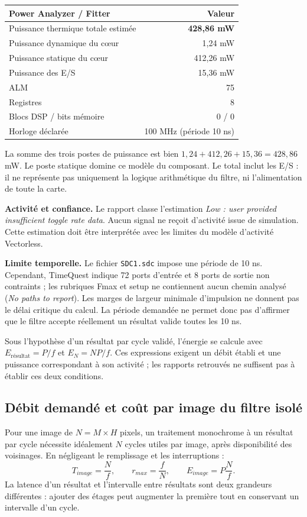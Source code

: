 \documentclass[11pt,a4paper]{article}
\begin{document}
\begin{center}
\begin{tabular}{@{}lr@{}}
\toprule
Power Analyzer / Fitter & Valeur\\
\midrule
Puissance thermique totale estimée & \textbf{428,86 mW}\\
Puissance dynamique du c\oe{}ur & 1,24 mW\\
Puissance statique du c\oe{}ur & 412,26 mW\\
Puissance des E/S & 15,36 mW\\
ALM & 75\\
Registres & 8\\
Blocs DSP / bits mémoire & 0 / 0\\
Horloge déclarée & 100 MHz (période 10 ns)\\
\bottomrule
\end{tabular}
\end{center}
La somme des trois postes de puissance est bien $1{,}24+412{,}26+15{,}36=428{,}86$ mW. Le poste statique domine ce modèle du composant. Le total inclut les E/S : il ne représente pas uniquement la logique arithmétique du filtre, ni l'alimentation de toute la carte.

\textbf{Activité et confiance.} Le rapport classe l'estimation \emph{Low : user provided insufficient toggle rate data}. Aucun signal ne reçoit d'activité issue de simulation. Cette estimation doit être interprétée avec les limites du modèle d'activité Vectorless.

\textbf{Limite temporelle.} Le fichier \texttt{SDC1.sdc} impose une période de 10 ns. Cependant, TimeQuest indique 72 ports d'entrée et 8 ports de sortie non contraints ; les rubriques Fmax et setup ne contiennent aucun chemin analysé (\emph{No paths to report}). Les marges de largeur minimale d'impulsion ne donnent pas le délai critique du calcul. La période demandée ne permet donc pas d'affirmer que le filtre accepte réellement un résultat valide toutes les 10 ns.

Sous l'hypothèse d'un résultat par cycle validé, l'énergie se calcule avec $E_{\mathrm{résultat}}=P/f$ et $E_N=NP/f$. Ces expressions exigent un débit établi et une puissance correspondant à son activité ; les rapports retrouvés ne suffisent pas à établir ces deux conditions.

\newpage
\subsection{Débit demandé et coût par image du filtre isolé}
Pour une image de $N=M\times H$ pixels, un traitement monochrome à un résultat par cycle nécessite idéalement $N$ cycles utiles par image, après disponibilité des voisinages. En négligeant le remplissage et les interruptions :
\[
 T_{image}=\frac{N}{f},\qquad r_{max}=\frac{f}{N},\qquad
 E_{image}=P\frac{N}{f}.
\]
La latence d'un résultat et l'intervalle entre résultats sont deux grandeurs différentes : ajouter des étages peut augmenter la première tout en conservant un intervalle d'un cycle.
\end{document}
